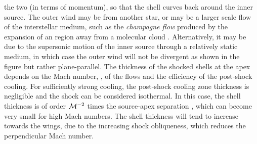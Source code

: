 the two (in terms of momentum), so that the shell curves back around
the inner source.  The outer wind may be from another star, or may be
a larger scale flow of the interstellar medium, such as the
\textit{champagne flow} produced by the expansion of an \hii{} region
away from a molecular cloud \citep{Tenorio-Tagle:1979a, Shu:2002a,
  Medina:2014a}.  Alternatively, it may be due to the supersonic
motion of the inner source through a relatively static medium, in
which case the outer wind will not be divergent as shown in the figure
but rather plane-parallel.  The thickness of the shocked shells at the
apex depends on the Mach number, \Mach{}, of the flows and the
efficiency of the post-shock cooling.  For sufficiently strong
cooling, the post-shock cooling zone thickness is negligible and the
shock can be considered isothermal.  In this case, the shell thickness
is of order \(\mathcal{M}^{-2}\) times the source-apex separation
\citep{Henney:2002a}, which can become very small for high Mach
numbers.  The shell thickness will tend to increase towards the wings,
due to the increasing shock obliqueness, which reduces the
perpendicular Mach number.

